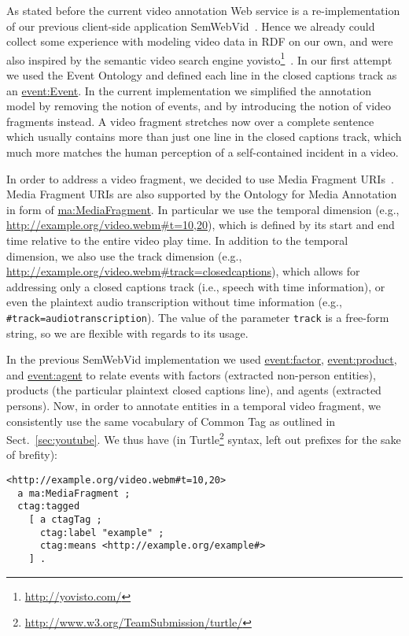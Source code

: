 \documentclass{acm_proc_article-sp}
\begin{document}
As stated before the current video annotation Web service is a re-implementation of our previous client-side application SemWebVid~\cite{Steiner:SemWebVid}. Hence we already could collect some experience with modeling video data in RDF on our own, and were also inspired by the semantic video search engine yovisto\footnote{\url{http://yovisto.com/}}~\cite{Sack:Use, Sack:VideoSearch}. In our first attempt we used the Event Ontology\cite{Raimond:Event} and defined each line in the closed captions track as an \url{event:Event}. In the current implementation we simplified the annotation model by removing the notion of events, and by introducing the notion of video fragments instead. A video fragment stretches now over a complete sentence which usually contains more than just one line in the closed captions track, which much more matches the human perception of a self-contained incident in a video. 

In order to address a video fragment, we decided to use Media Fragment URIs~\cite{W3C:MediaFrags}. Media Fragment URIs are also supported by the Ontology for Media Annotation in form of \url{ma:MediaFragment}. In particular we use the temporal dimension (e.g., \url{http://example.org/video.webm#t=10,20}), which is defined by its start and end time relative to the entire video play time. In addition to the temporal dimension, we also use the track dimension (e.g., \url{http://example.org/video.webm#track=closedcaptions}), which allows for addressing only a closed captions track (i.e., speech with time information), or even the plaintext audio transcription without time information (e.g., \texttt{\#track=audiotranscription}). The value of the parameter \texttt{track} is a free-form string, so we are flexible with regards to its usage.

In the previous SemWebVid implementation we used \url{event:factor}, \url{event:product}, and \url{event:agent} to relate events with factors (extracted non-person entities), products (the particular plaintext closed captions line), and agents (extracted persons). Now, in order to annotate entities in a temporal video fragment, we consistently use the same vocabulary of Common Tag as outlined in Sect.~\ref{sec:youtube}. We thus have (in Turtle\footnote{\url{http://www.w3.org/TeamSubmission/turtle/}} syntax, left out prefixes for the sake of brefity):
\begin{lstlisting}
<http://example.org/video.webm#t=10,20> 
  a ma:MediaFragment ;
  ctag:tagged 
    [ a ctagTag ;
      ctag:label "example" ;
      ctag:means <http://example.org/example#>
    ] .
\end{lstlisting}
\end{document}
